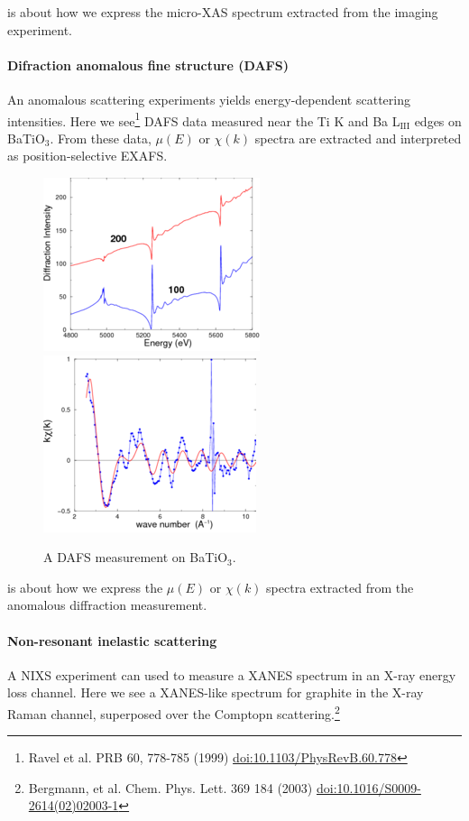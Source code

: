 \documentclass{article}
\begin{document}
{\xdi} is about how we express the micro-XAS spectrum extracted from
the imaging experiment.

\paragraph{Difraction anomalous fine structure (DAFS)}

An anomalous scattering experiments yields energy-dependent scattering
intensities.  Here we see\footnote{Ravel et al. PRB 60, 778-785 (1999)
  \href{http://dx.doi.org/10.1103/PhysRevB.60.778}{doi:10.1103/PhysRevB.60.778}}
DAFS data measured near the Ti K and Ba L$_{\mathrm{III}}$ edges on
BaTiO$_3$.  From these data, $\mu(E)$ or $\chi(k)$ spectra are
extracted and interpreted as position-selective EXAFS.

\begin{figure}[h]
  \centering
  \includegraphics[width=0.3\linewidth]{dafs.png}
  \includegraphics[width=0.3\linewidth]{dafschik.png}
  \caption{A DAFS measurement on BaTiO$_3$.}
  \label{fig:dafs}
\end{figure}

{\xdi} is about how we express the $\mu(E)$ or $\chi(k)$ spectra
extracted from the anomalous diffraction measurement.


\paragraph{Non-resonant inelastic scattering}

A NIXS experiment can used to measure a XANES spectrum in an X-ray
energy loss channel.  Here we see a XANES-like spectrum for graphite
in the X-ray Raman channel, superposed over the Comptopn
scattering.\footnote{Bergmann, et al. Chem. Phys. Lett. 369 184 (2003)
  \href{http://dx.doi.org/10.1016/S0009-2614(02)02003-1}{doi:10.1016/S0009-2614(02)02003-1}}
\end{document}

